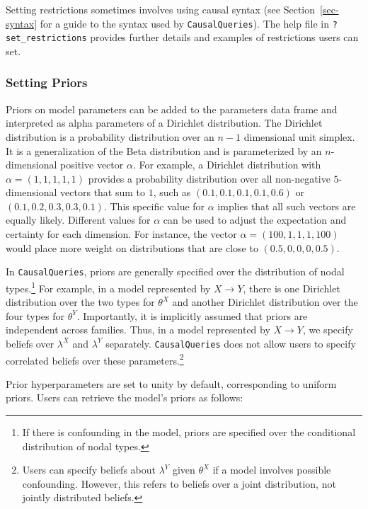 \documentclass[
  11pt,
  article]{jss}
\begin{document}
Setting restrictions sometimes involves using causal syntax (see
Section~\ref{sec-syntax} for a guide to the syntax used by
\texttt{CausalQueries}). The help file in \texttt{?set\_restrictions}
provides further details and examples of restrictions users can set.

\subsubsection{Setting Priors}\label{priors}

Priors on model parameters can be added to the parameters data frame and
interpreted as alpha parameters of a Dirichlet distribution. The
Dirichlet distribution is a probability distribution over an \(n-1\)
dimensional unit simplex. It is a generalization of the Beta
distribution and is parameterized by an \(n\)-dimensional positive
vector \(\alpha\). For example, a Dirichlet distribution with
\(\alpha = (1, 1, 1, 1, 1)\) provides a probability distribution over
all non-negative \(5\)-dimensional vectors that sum to \(1\), such as
\((0.1, 0.1, 0.1, 0.1, 0.6)\) or \((0.1, 0.2, 0.3, 0.3, 0.1)\). This
specific value for \(\alpha\) implies that all such vectors are equally
likely. Different values for \(\alpha\) can be used to adjust the
expectation and certainty for each dimension. For instance, the vector
\(\alpha = (100, 1, 1, 1, 100)\) would place more weight on
distributions that are close to \((0.5, 0, 0, 0, 0.5)\).

In \texttt{CausalQueries}, priors are generally specified over the
distribution of nodal types.\footnote{If there is confounding in the
  model, priors are specified over the conditional distribution of nodal
  types.} For example, in a model represented by \(X \rightarrow Y\),
there is one Dirichlet distribution over the two types for \(\theta^X\)
and another Dirichlet distribution over the four types for \(\theta^Y\).
Importantly, it is implicitly assumed that priors are independent across
families. Thus, in a model represented by \(X \rightarrow Y\), we
specify beliefs over \(\lambda^X\) and \(\lambda^Y\) separately.
\texttt{CausalQueries} does not allow users to specify correlated
beliefs over these parameters.\footnote{Users can specify beliefs about
  \(\lambda^Y\) given \(\theta^X\) if a model involves possible
  confounding. However, this refers to beliefs over a joint
  distribution, not jointly distributed beliefs.}

Prior hyperparameters are set to unity by default, corresponding to
uniform priors. Users can retrieve the model's priors as follows:
\end{document}
